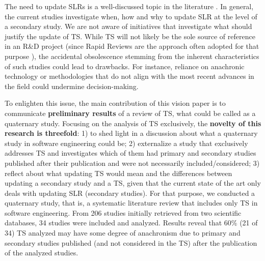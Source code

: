 \documentclass[sigconf]{acmart}
\begin{document}
The need to update SLRs is a well-discussed topic in the literature \cite{Mendes2020,wohlin2020guidelines,wohlin2022successful,mendes2019search,felizardo2018evaluating,garner2016and}. %
In general, the current studies investigate when, how and why to update SLR at the level of a secondary study. We are not aware of initiatives that investigate what should justify the update of TS. While TS will not likely be the sole source of reference in an R\&D project (since Rapid Reviews are the approach often adopted for that purpose \cite{cartaxo2018role,cartaxo2020rapid}), the accidental obsolescence stemming from the inherent characteristics of such studies could lead to drawbacks. For instance, reliance on anachronic technology or methodologies that do not align with the most recent advances in the field could undermine decision-making.   

To enlighten this issue, the main contribution of this vision paper is to communicate \textbf{preliminary results} of a review of TS, what could be called as a quaternary study. Focusing on the analysis of TS exclusively, the \textbf{novelty of this research is threefold}:%
1) to shed light in a discussion about what a quaternary study in software engineering could be; 2) externalize a study that exclusively addresses TS and investigates which of them had primary and secondary studies published after their publication and were not necessarily included/considered; 3) reflect about what updating TS would mean and the differences between updating a secondary study and a TS, given that the current state of the art only deals with updating SLR (secondary studies). For that purpose, we conducted a quaternary study, that is, a systematic literature review that includes only TS in software engineering. From 206 studies initially  retrieved from two scientific databases, 34 studies were included and analyzed. Results reveal that 60\% (21 of 34) TS analyzed may have some degree of anachronism due to primary and secondary studies published (and not considered in the TS) after the publication of the analyzed studies.
\end{document}
